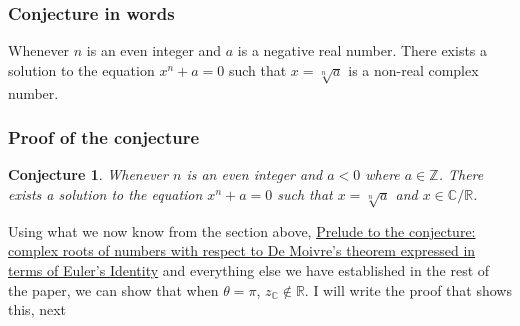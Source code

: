 \documentclass{turabian-researchpaper}
\newtheorem*{conjecture*}{Conjecture}
\begin{document}
\subsubsection{Conjecture in words} 

Whenever \(n\) is an even integer and \(a\) is a negative real number. There exists a solution to the equation \(x^n + a = 0\) such that \(x = \sqrt[n]{a}\) is a non-real complex number. 

\subsubsection{Proof of the conjecture}

\begin{conjecture*}
    Whenever \(n\) is an even integer and \(a < 0\) where \(a \in \mathds{Z}\). There exists a solution to the equation \(x^n + a = 0\) such that \(x = \sqrt[n]{a}\) and \(x \in \mathds{C}/\mathds{R}\). 
\end{conjecture*}

Using what we now know from the section above, \hyperlink{Prelude}{Prelude to the conjecture: complex roots of numbers with respect to De Moivre's theorem expressed in terms of Euler's Identity} and everything else we have established in the rest of the paper, we can show that when \(\theta = \pi\), \(z_{\mathds{C}} \notin \mathds{R}\). I will write the proof that shows this, next 
\end{document}
